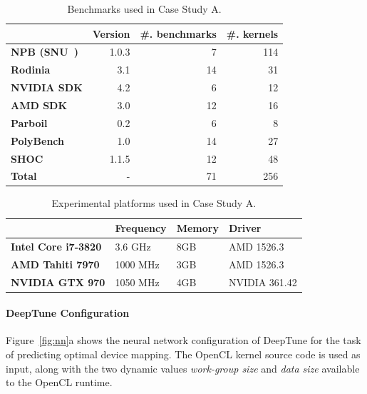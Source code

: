 \begin{table}
	\centering%
	\begin{tabular}{| l r r r |}
		\hline
		\rowcolor{gray!50}
		& \textbf{Version} & \textbf{\#. benchmarks} & \textbf{\#. kernels}\\
		\hline
		\textbf{NPB (SNU~\cite{Seo2011})} & 1.0.3 & 7 & 114 \\
		\textbf{Rodinia~\cite{Che2009}} & 3.1 & 14 & 31 \\
		\textbf{NVIDIA SDK} & 4.2 & 6 & 12 \\
		\textbf{AMD SDK} & 3.0 & 12 & 16 \\
		\textbf{Parboil~\cite{Stratton2012}} & 0.2 & 6 & 8 \\
		\textbf{PolyBench~\cite{Grauer-Gray2012}} & 1.0 & 14 & 27 \\
		\textbf{SHOC~\cite{Danalis2010}} & 1.1.5 & 12 & 48 \\
		\textbf{Total} & - & 71 & 256 \\
		\hline
	\end{tabular}
  \caption[Benchmarks used in Case Study A]{%
	  Benchmarks used in Case Study A.%
  }
	\label{tab:cgo-benchmarks}
\end{table}

\begin{table}[t!]
	\centering %
		\begin{tabular}{| l l l l| }
			\hline
			\rowcolor{gray!50}
			& \textbf{Frequency} & \textbf{Memory} & \textbf{Driver} \\
			\hline
			\textbf{Intel Core i7-3820} & 3.6 GHz & 8GB & AMD 1526.3 \\
			\textbf{AMD Tahiti 7970} & 1000 MHz & 3GB & AMD 1526.3 \\
			\textbf{NVIDIA GTX 970} & 1050 MHz & 4GB & NVIDIA 361.42 \\
			\hline
		\end{tabular}
	  \caption[Benchmarks used in Case Study A]{%
		Experimental platforms used in Case Study A.%
  	}
		\label{tab:cgo-platforms}
\end{table}


\paragraph*{DeepTune Configuration} 

Figure~\ref{fig:nn}a shows the neural network configuration of DeepTune for the task of predicting optimal device mapping. The OpenCL kernel source code is used as input, along with the two dynamic values \emph{work-group size} and \emph{data size} available to the OpenCL runtime.

